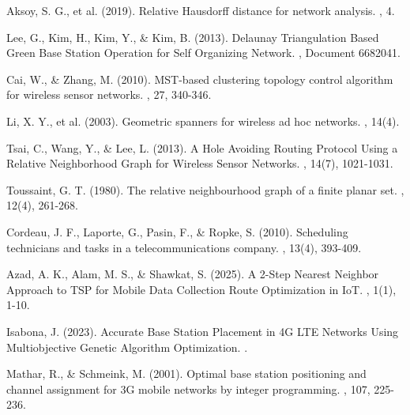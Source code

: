 \documentclass[12pt,a4paper]{report}
\begin{document}
\begin{thebibliography}{40}
Aksoy, S. G., et al. (2019).
\newblock Relative Hausdorff distance for network analysis.
, 4.

Lee, G., Kim, H., Kim, Y., \& Kim, B. (2013).
\newblock Delaunay Triangulation Based Green Base Station Operation for Self Organizing Network.
, Document 6682041.

Cai, W., \& Zhang, M. (2010).
\newblock MST-based clustering topology control algorithm for wireless sensor networks.
, 27, 340-346.

Li, X. Y., et al. (2003).
\newblock Geometric spanners for wireless ad hoc networks.
, 14(4).

Tsai, C., Wang, Y., \& Lee, L. (2013).
\newblock A Hole Avoiding Routing Protocol Using a Relative Neighborhood Graph for Wireless Sensor Networks.
, 14(7), 1021-1031.

Toussaint, G. T. (1980).
\newblock The relative neighbourhood graph of a finite planar set.
, 12(4), 261-268.

Cordeau, J. F., Laporte, G., Pasin, F., \& Ropke, S. (2010).
\newblock Scheduling technicians and tasks in a telecommunications company.
, 13(4), 393-409.

Azad, A. K., Alam, M. S., \& Shawkat, S. (2025).
\newblock A 2-Step Nearest Neighbor Approach to TSP for Mobile Data Collection Route Optimization in IoT.
, 1(1), 1-10.

Isabona, J. (2023).
\newblock Accurate Base Station Placement in 4G LTE Networks Using Multiobjective Genetic Algorithm Optimization.
.

Mathar, R., \& Schmeink, M. (2001).
\newblock Optimal base station positioning and channel assignment for 3G mobile networks by integer programming.
, 107, 225-236.

\end{thebibliography}
\end{document}
